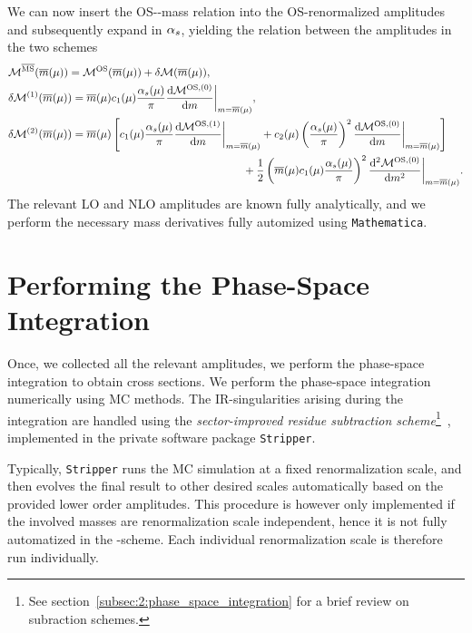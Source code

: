 We can now insert the \acs{OS}-\MS-mass relation into the \acs{OS}-renormalized amplitudes and subsequently expand in $\alpha_s$, yielding the relation between the amplitudes in the two schemes
\begin{equation}
\begin{split}
  & \mathcal{M}^{\overline{\text{MS}}}(\overline{m}(\mu)) = \mathcal{M}^{\text{OS}}(\overline{m}(\mu)) + \delta \mathcal{M} (\overline{m}(\mu)), \\
  & \delta \mathcal{M}^{(1)} (\overline{m}(\mu)) = \overline{m}(\mu)c_1(\mu) \frac{\alpha_s(\mu)}{\pi}\frac{\mathrm{d} \mathcal{M}^{\text{OS},(0)}}{\mathrm{d} m} \bigg \vert_{m = \overline{m}(\mu)} , \\
  & \delta \mathcal{M}^{(2)} (\overline{m}(\mu)) = \overline{m}(\mu) \left[ c_1(\mu) \frac{\alpha_s(\mu)}{\pi} \frac{\mathrm{d} \mathcal{M}^{\text{OS},(1)}}{\mathrm{d} m}\bigg \vert_{m = \overline{m}(\mu)}  + c_2(\mu) \left(\frac{\alpha_s(\mu)}{\pi}\right)^2 \frac{\mathrm{d}\mathcal{M}^{\text{OS},(0)}}{\mathrm{d}m}\bigg \vert_{m = \overline{m}(\mu)}  \right] \\
  & \hspace{7.5cm}+ \frac{1}{2}\left(\overline{m}(\mu) c_1(\mu) \frac{\alpha_s(\mu)}{\pi} \right)^2 \frac{\mathrm{d}^2 \mathcal{M}^{\text{OS},(0)}}{\mathrm{d} m^2} \bigg \vert_{m = \overline{m}(\mu)} .
\end{split}
\end{equation}
The relevant \acs{LO} and \acs{NLO} amplitudes are known fully analytically, and we perform the necessary mass derivatives fully automized using \texttt{Mathematica}.


\section{Performing the Phase-Space Integration}
Once, we collected all the relevant amplitudes, we perform the phase-space integration to obtain cross sections. We perform the phase-space integration numerically using \acs{MC} methods. The \acs{IR}-singularities arising during the integration are handled using the \textit{sector-improved residue subtraction scheme}\footnote{See section~\ref{subsec:2:phase_space_integration} for a brief review on subraction schemes.}~\cite{Czakon:2010td}, implemented in the private software package \texttt{Stripper}.

Typically, \texttt{Stripper} runs the \acs{MC} simulation at a fixed renormalization scale, and then evolves the final result to other desired scales automatically based on the provided lower order amplitudes. This procedure is however only implemented if the involved masses are renormalization scale independent, hence it is not fully automatized in the \MS-scheme. Each individual renormalization scale is therefore run individually.

